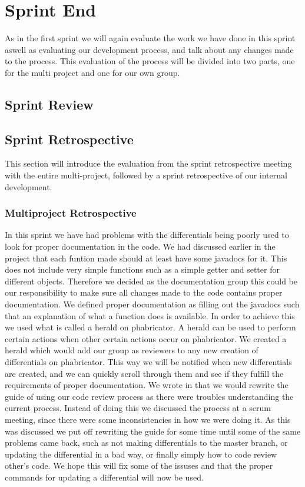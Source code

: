 \chapter{Sprint End}
As in the first sprint we will again evaluate the work we have done in this sprint aswell as evaluating our development process, and talk about any changes made to the process.
This evaluation of the process will be divided into two parts, one for the multi project and one for our own group.
\section{Sprint Review}

\section{Sprint Retrospective}
This section will introduce the evaluation from the sprint retrospective meeting with the entire multi-project, followed by a sprint retrospective of our internal development.
\subsection*{Multiproject Retrospective}
In this sprint we have had problems with the differentials being poorly used to look for proper documentation in the code.
We had discussed earlier in the project that each funtion made should at least have some javadocs for it.
This does not include very simple functions such as a simple getter and setter for different objects.
Therefore we decided as the documentation group this could be our responsibility to make sure all changes made to the code contains proper documentation.
We defined proper documentation as filling out the javadocs such that an explanation of what a function does is available.
In order to achieve this we used what is called a herald on phabricator.
A herald can be used to perform certain actions when other certain actions occur on phabricator.
We created a herald which would add our group as reviewers to any new creation of differentials on phabricator.
This way we will be notified when new differentials are created, and we can quickly scroll through them and see if they fulfill the requirements of proper documentation.
We wrote in  that we would rewrite the guide of using our code review process as there were troubles understanding the current process.
Instead of doing this we discussed the process at a scrum meeting, since there were some inconsistencies in how we were doing it.
As this was discussed we put off rewriting the guide for some time until some of the same problems came back, such as not making differentials to the master branch, or updating the differential in a bad way, or finally simply how to code review other's code.
We hope this will fix some of the issuses and that the proper commands for updating a differential will now be used.

